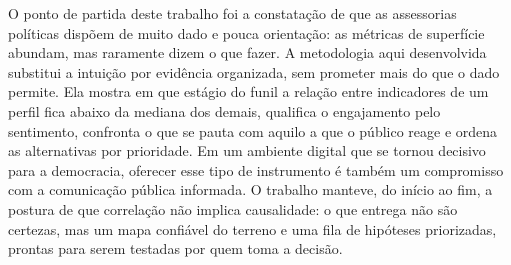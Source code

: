 O ponto de partida deste trabalho foi a constatação de que as assessorias políticas dispõem de muito dado e pouca orientação: as métricas de superfície abundam, mas raramente dizem o que fazer. A metodologia aqui desenvolvida substitui a intuição por evidência organizada, sem prometer mais do que o dado permite. Ela mostra em que estágio do funil a relação entre indicadores de um perfil fica abaixo da mediana dos demais, qualifica o engajamento pelo sentimento, confronta o que se pauta com aquilo a que o público reage e ordena as alternativas por prioridade. Em um ambiente digital que se tornou decisivo para a democracia, oferecer esse tipo de instrumento é também um compromisso com a comunicação pública informada. O trabalho manteve, do início ao fim, a postura de que correlação não implica causalidade: o que entrega não são certezas, mas um mapa confiável do terreno e uma fila de hipóteses priorizadas, prontas para serem testadas por quem toma a decisão.
